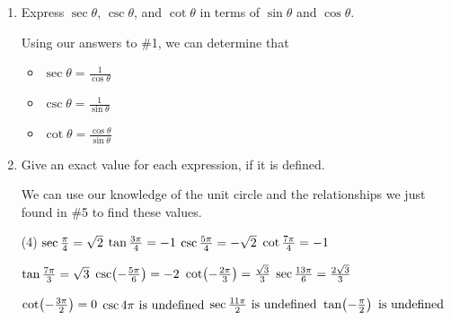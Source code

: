 \documentclass[main]{subfiles}
\begin{document}
\pspace{\newpage}

\begin{enumerate}[resume]
\item 
\begin{problem}
    Express $\sec \theta$, $\csc \theta$, and $\cot \theta$ in terms of $\sin \theta$ and $\cos \theta$.
\end{problem}
\pspace{\vfill}

\begin{solution}
Using our answers to \#1, we can determine that
    \begin{itemize}
        \item $\sec\theta=\frac{1}{\cos\theta}$
        \item $\csc\theta=\frac{1}{\sin\theta}$
        \item $\cot\theta=\frac{\cos\theta}{\sin\theta}$
    \end{itemize}
\end{solution}

\item  Give an exact value for each expression, if it is defined.

\begin{solution}
    We can use our knowledge of the unit circle and the relationships we just found in \#5 to find these values.
\end{solution}

\begin{tasks}[after-item-skip=48pt, after-skip=48pt](4)
    \task $\sec \frac{\pi}{4}=\sqrt{2}$
    \task $\tan \frac{3\pi}{4}=-1$
    \task $\csc \frac{5\pi}{4}=-\sqrt{2}$
    \task $\cot \frac{7\pi}{4}=-1$

    \task $\tan \frac{7\pi}{3}=\sqrt{3}$
    \task $\csc\!\left(-\frac{5\pi}{6}\right)=-2$
    \task $\cot\!\left(-\frac{2\pi}{3}\right)=\frac{\sqrt{3}}{3}$
    \task $\sec\frac{13\pi}{6}=\frac{2\sqrt{3}}{3}$


    \task $\cot\!\left(-\frac{3\pi}{2}\right)=0$
    \task $\csc 4\pi\text{ is undefined}$
    \task $\sec \frac{11\pi}{2}\text{ is undefined}$
    \task $\tan\!\left(-\frac{\pi}{2}\right)\text{ is undefined}$

    
\end{tasks}



\end{enumerate}
\end{document}
